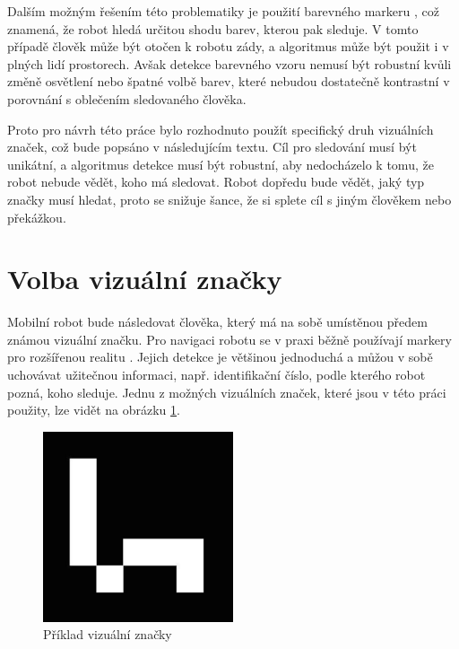 \documentclass[twoside]{ctuthesis}
\theoremstyle{plain}
\theoremstyle{definition}
\theoremstyle{note}
\begin{document}
Dalším možným řešením této problematiky je použití barevného markeru \cite{cite:18}, což znamená, že robot hledá určitou shodu barev, kterou pak sleduje. V tomto případě člověk může být otočen k robotu zády, a algoritmus může být použit i v plných lidí prostorech. Avšak detekce barevného vzoru nemusí být robustní kvůli změně osvětlení nebo špatné volbě barev, které nebudou dostatečně kontrastní v porovnání s oblečením sledovaného člověka.

Proto pro návrh této práce bylo rozhodnuto použít specifický druh vizuálních značek, což bude popsáno v následujícím textu. Cíl pro sledování musí být unikátní, a algoritmus detekce musí být robustní, aby nedocházelo k tomu, že robot nebude vědět, koho má sledovat. Robot dopředu bude vědět, jaký typ značky musí hledat, proto se snižuje šance, že si splete cíl s jiným člověkem nebo překážkou. 

\section{Volba vizuální značky}


Mobilní robot bude následovat člověka, který má na sobě umístěnou předem známou vizuální značku. Pro navigaci robotu se v praxi běžně používají markery pro rozšířenou realitu \cite{cite:1}\cite{cite:2}\cite{cite:3}. Jejich detekce je většinou jednoduchá a můžou v sobě uchovávat užitečnou informaci, např. identifikační číslo, podle kterého robot pozná, koho sleduje. Jednu z možných vizuálních značek, které jsou v této práci použity, lze vidět na obrázku \ref{am}.

\begin{figure}[]
	\caption{Příklad vizuální značky}

	\label{am}
	\includegraphics[width=0.5\textwidth]{images/2/ArucoMarker.jpg}
\end{figure}
\end{document}
